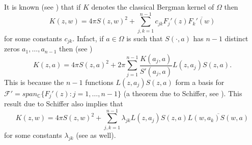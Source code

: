 \documentclass[11pt, reqno]{amsart}
\numberwithin{equation}{section}
\newcommand{\Om}{\Omega}
\begin{document}
	\medskip
	
	It is known (see \cite{Be0, Bergman}) that if $K$ denotes the classical Bergman kernel of $\Om$ then
	\begin{equation}\label{ks}
	K(z,w) = 4\pi S(z,w)^2 + \sum_{j,k=1}^{n-1} c_{jk}F_{j}'(z) \overline{F_{k}'(w)}
	\end{equation}
	for some constants $c_{jk}$. Infact, if $a\in\Om$ is such that $S(\cdot,a)$ has $n-1$ distinct zeros $a_1,\ldots,a_{n-1}$ then (see \cite{Be0, Be5})
	\begin{equation}
	K(z,a) = 4\pi S(z,a)^2 + 2\pi\sum_{j=1}^{n-1} \frac{K(a_j,a)}{S'(a_j,a)}L(z,a_j)S(z,a).
	\end{equation}
	This is because the $n-1$ functions $L(z,a_j)S(z,a)$ form a basis for $\mathcal{F}'=span_{\mathbb{C}}\{ F_j'(z) : j=1,\ldots, n-1 \}$ (a theorem due to Schiffer, see \cite{Be0, Be5, Sch}). This result due to Schiffer also implies that
	\begin{equation}\label{ks2}
	K(z,w) = 4\pi S(z,w)^2 + \sum_{j,k=1}^{n-1} \lambda_{jk} L(z,a_j)S(z,a) \overline{L(w,a_k)S(w,a)}
	\end{equation}
	for some constants $\lambda_{jk}$ (see \cite{Be4} as well).
	
	\medskip
	
\end{document}
